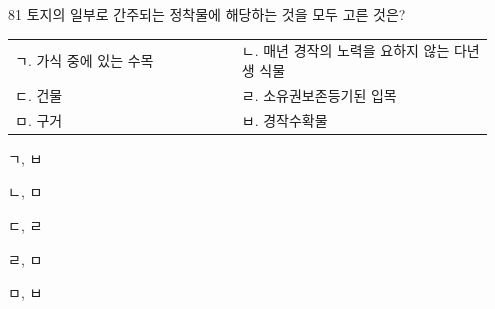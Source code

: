 \begin{question}{81}
토지의 일부로 간주되는 정착물에 해당하는 것을 모두 고른 것은?
\begin{framedtext}
\begin{tabular}{@{}p{0.45\linewidth}p{0.5\linewidth}@{}}
ㄱ. 가식 중에 있는 수목 & ㄴ. 매년 경작의 노력을 요하지 않는 다년생 식물 \\
ㄷ. 건물 & ㄹ. 소유권보존등기된 입목 \\
ㅁ. 구거 & ㅂ. 경작수확물 \\
\end{tabular}
\end{framedtext}
\begin{choices}
  \item ㄱ, ㅂ
  \item ㄴ, ㅁ
  \item ㄷ, ㄹ
  \item ㄹ, ㅁ
  \item ㅁ, ㅂ
\end{choices}
\end{question}
